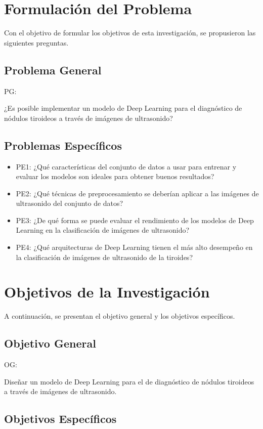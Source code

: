 \section{Formulación del Problema}
Con el objetivo de formular los objetivos de esta investigación, se propusieron las siguientes preguntas.
\subsection{Problema General}
PG: \newcommand{\ProblemaGeneral}{
¿Es posible implementar un modelo de Deep Learning para el diagnóstico de nódulos tiroideos a través de imágenes de ultrasonido?
}
\ProblemaGeneral
\subsection{Problemas Específicos}
\newcommand{\Pbone}{
¿Qué características del conjunto de datos a usar para entrenar y evaluar los modelos son ideales para obtener buenos resultados?
}
\newcommand{\Pbtwo}{
¿Qué técnicas de preprocesamiento se deberían aplicar a las imágenes de ultrasonido del conjunto de datos?
}
\newcommand{\Pbthree}{
¿De qué forma se puede evaluar el rendimiento de los modelos de Deep Learning en la clasificación de imágenes de ultrasonido?
}
\newcommand{\Pbfour}{
¿Qué arquitecturas de Deep Learning tienen el más alto desempeño en la clasificación de imágenes de ultrasonido de la tiroides?
}

\begin{itemize}
	\item PE1: {\Pbone}
	\item PE2: {\Pbtwo}
	\item PE3: {\Pbthree}
	\item PE4: {\Pbfour}
\end{itemize}

\section{Objetivos de la Investigación}
A continuación, se presentan el objetivo general y los objetivos específicos.
\subsection{Objetivo General}
OG: \newcommand{\ObjetivoGeneral}{
Diseñar un modelo de Deep Learning para el de diagnóstico de nódulos tiroideos a través de imágenes de ultrasonido.
}
\ObjetivoGeneral
\subsection{Objetivos Específicos}
\newcommand{\Objone}{
Determinar las características ideales del conjunto de datos a usar para entrenar y evaluar los modelos.
}
\newcommand{\Objtwo}{
Determinar las técnicas de preprocesamiento que se deben aplicar a las imágenes de ultrasonido del conjunto de datos.
}
\newcommand{\Objthree}{
Identificar las métricas de evaluación de rendimiento de los modelos de Deep Learning en la clasificación de imágenes de ultrasonido.
}
\newcommand{\Objfour}{
Determinar las arquitecturas de Deep Learning que tienen el más alto desempeño en la clasificación de imágenes de ultrasondio de la tiroides.
}

